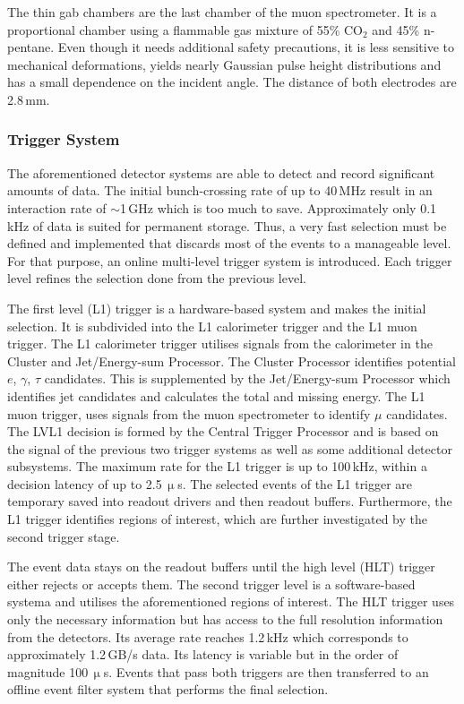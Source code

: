 \documentclass[bachelor,ngerman,english]{GAUBM}
\begin{document}
The thin gab chambers \cite{atlas:tech_design_report_01,atlas:muon_chamber} are the last chamber of the muon spectrometer. It is a proportional chamber using a flammable gas mixture of 55\% CO$_2$ and 45\% n-pentane. Even though it needs additional safety precautions, it is less sensitive to mechanical deformations, yields nearly Gaussian pulse height distributions and has a small dependence on the incident angle. The distance of both electrodes are 2.8\,mm.

\subsubsection*{Trigger System}
The aforementioned detector systems are able to detect and record significant amounts of data. The initial bunch-crossing rate of up to 40\,MHz result in an interaction rate of $\sim$1\,GHz \cite{atlas:tech_design_report_01} which is too much to save. Approximately only 0.1\,kHz of data is suited for permanent storage. Thus, a very fast selection must be defined and implemented that discards most of the events to a manageable level. For that purpose, an online multi-level trigger system is introduced. Each trigger level refines the selection done from the previous level.

The first level (L1) trigger \cite{atlas:tech_design_report_01,atlas:trigger_run2} is a hardware-based system and makes the initial selection. It is subdivided into the L1 calorimeter trigger and the L1 muon trigger. The L1 calorimeter trigger utilises signals from the calorimeter in the Cluster and Jet/Energy-sum Processor. The Cluster Processor identifies potential $e$, $\gamma$, $\tau$ candidates. This is supplemented by the Jet/Energy-sum Processor which identifies jet candidates and calculates the total and missing energy. The L1 muon trigger, uses signals from the muon spectrometer to identify $\mu$ candidates. The LVL1 decision is formed by the Central Trigger Processor and is based on the signal of the previous two trigger systems as well as some additional detector subsystems. The maximum rate for the L1 trigger is up to 100\,kHz, within a decision latency of up to 2.5\,$\upmu$s. The selected events of the L1 trigger are temporary saved into readout drivers and then readout buffers. Furthermore, the L1 trigger identifies regions of interest, which are further investigated by the second trigger stage.

The event data stays on the readout buffers until the high level (HLT) trigger \cite{atlas:tech_design_report_01,atlas:trigger_run2} either rejects or accepts them. The second trigger level is a software-based systema and utilises the aforementioned regions of interest. The HLT trigger uses only the necessary information but has access to the full resolution information from the detectors. Its average rate reaches 1.2\,kHz which corresponds to approximately 1.2\,GB/s data. Its latency is variable but in the order of magnitude 100\,$\upmu$s. Events that pass both triggers are then transferred to an offline event filter system that performs the final selection.
\end{document}
